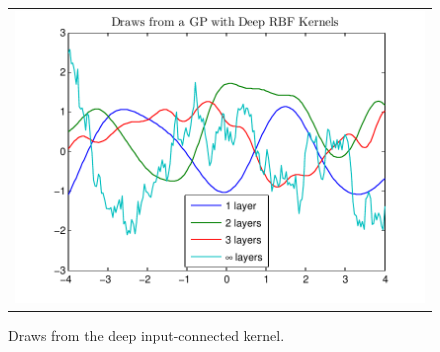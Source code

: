 \documentclass[twoside]{article}
\makeatletter
\newlength{\nonHumbleHeight}
\def\@humbleformat#1{{\settoheight{\nonHumbleHeight}{#1}\resizebox{!}{0.94\nonHumbleHeight}{#1}}}%
\def\humble#1{\@humbleformat{#1}}%
\newcommand{\gp}{{\humble GP}}
\makeatother
\begin{document}
\begin{figure}[h]
\centering
\begin{tabular}{c}
\hspace{-0.5cm}\includegraphics[width=\columnwidth, clip, trim = 0cm 0cm 1cm 0.61cm]{figures/deep_kernel_connected_draws} \\
\end{tabular}
\caption{Draws from the deep input-connected kernel.  
}
\label{fig:deep_kernel_connected_draws}
\end{figure}
\end{document}
